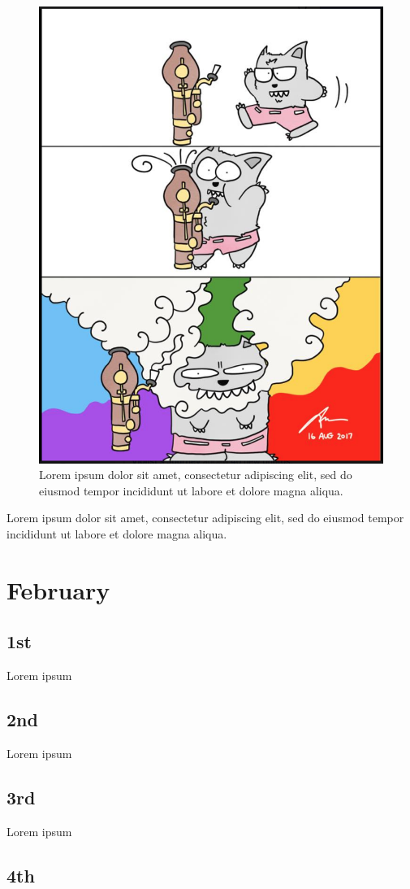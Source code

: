 \documentclass[a4paper,12pt]{memoir}
\begin{document}
\begin{figure}[h]
\centering 
\includegraphics[width=0.5\columnwidth]{imageindirectory.png} 
\caption[An example of a figure]{Lorem ipsum dolor sit amet, consectetur adipiscing elit, sed do eiusmod tempor incididunt ut labore et dolore magna aliqua.} %
\end{figure}

Lorem ipsum dolor sit amet, consectetur adipiscing elit, sed do eiusmod tempor incididunt ut labore et dolore magna aliqua.

\chapter{February}

\section{1st}

Lorem ipsum

\section{2nd}

Lorem ipsum

\section{3rd}

Lorem ipsum

\section{4th}
\end{document}
